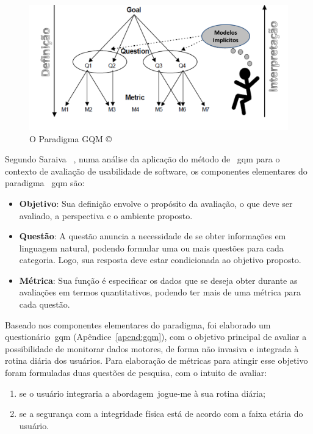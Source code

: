 \begin{figure}[!htbp]
 \centering
 \includegraphics[scale=0.50]{./img/gqm.png}
 \caption[O Paradigma GQM \copyright]{O Paradigma GQM \copyright~\cite{van1999goal}}
 \label{fig:gqm}
\end{figure}

Segundo Saraiva ~\cite{saraiva2006}, numa análise da aplicação do método de ~\ac{gqm} para o contexto de avaliação de usabilidade de software, os componentes elementares do paradigma ~\ac{gqm} são:

\begin{itemize}
	\item \textbf{Objetivo}: Sua definição envolve o propósito da avaliação, o que deve ser avaliado, a perspectiva e o ambiente proposto.
	\item \textbf{Questão}: A questão anuncia a necessidade de se obter informações em linguagem natural, podendo formular uma ou mais questões para cada categoria. Logo, sua resposta deve estar condicionada ao objetivo proposto.
	\item \textbf{Métrica}: Sua função é especificar os dados que se deseja obter durante as avaliações em termos quantitativos, podendo ter mais de uma métrica para cada questão.	
\end{itemize}

Baseado nos componentes elementares do paradigma, foi elaborado um questionário~\ac{gqm} (Apêndice~\ref{apend:gqm}), com o objetivo principal de avaliar a possibilidade de monitorar dados motores, de forma não invasiva e integrada à rotina diária dos usuários. Para elaboração de métricas para atingir esse objetivo foram formuladas duas questões de pesquisa, com o intuito de avaliar:
\begin{enumerate}
	\item se o usuário integraria a abordagem~\ac{jogue-me} à sua rotina diária;
	\item se a segurança com a integridade física está de acordo com a faixa etária do usuário.
\end{enumerate}

